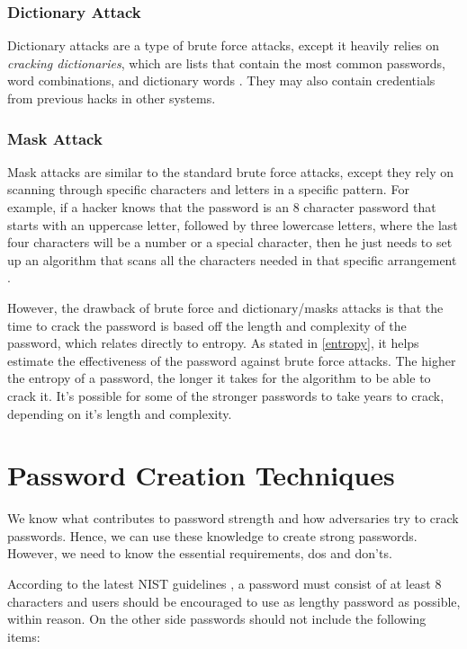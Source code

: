 \documentclass[acmsmall,nonacm]{acmart}
\begin{document}
\subsubsection{Dictionary Attack}
Dictionary attacks are a type of brute force attacks, except it heavily relies on \emph{cracking dictionaries}, which are lists that contain the most common passwords, word combinations, and dictionary words \cite{walker_2020}. They may also contain credentials from previous hacks in other systems. 

\subsubsection{Mask Attack}
Mask attacks are similar to the standard brute force attacks, except they rely on scanning through specific characters and letters in a specific pattern. For example, if a hacker knows that the password is an 8 character password that starts with an uppercase letter, followed by three lowercase letters, where the last four characters will be a number or a special character, then he just needs to set up an algorithm that scans all the characters needed in that specific arrangement \cite{jake_2018}.

However, the drawback of brute force and dictionary/masks attacks is that the time to crack the password is based off the length and complexity of the password, which relates directly to entropy. As stated in \ref{entropy}, it helps estimate the effectiveness of the password against brute force attacks. The higher the entropy of a password, the longer it takes for the algorithm to be able to crack it. It's possible for some of the stronger passwords to take years to crack, depending on it's length and complexity.

\section{Password Creation Techniques} \label{creation}

We know what contributes to password strength and how adversaries try to crack passwords. Hence, we can use these knowledge to create strong passwords. However, we need to know the essential requirements, dos and don'ts.

According to the latest NIST guidelines \cite{nist_2020}, a password must consist of at least 8 characters and users should be encouraged to use as lengthy password as possible, within reason. On the other side passwords should not include the following items:
\end{document}
